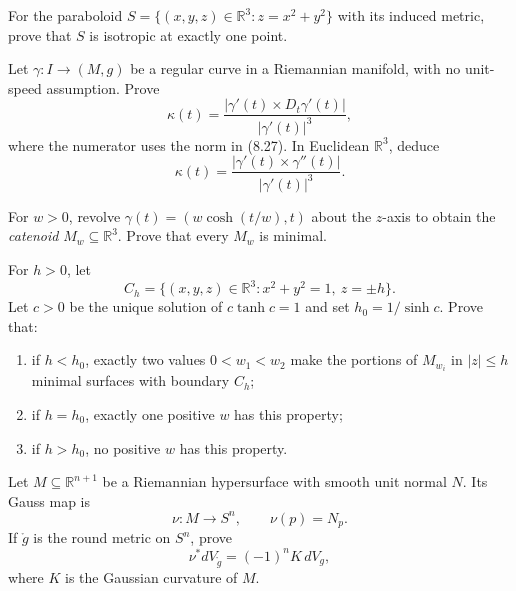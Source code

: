 \begin{exercise}
\label{prob:paraboloid-isotropic-one-point}

For the paraboloid
$S=\{(x,y,z)\in\mathbb R^3:z=x^2+y^2\}$ with its induced metric, prove that
$S$ is isotropic at exactly one point.
\end{exercise}

\begin{exercise}
\label{prob:geodesic-curvature-non-unit-speed-curve}

Let $\gamma:I\to(M,g)$ be a regular curve in a Riemannian manifold, with no
unit-speed assumption. Prove
\[
\kappa(t)=
\frac{|\gamma'(t)\times D_t\gamma'(t)|}{|\gamma'(t)|^3},
\]
where the numerator uses the norm in (8.27). In Euclidean $\mathbb R^3$,
deduce
\[
\kappa(t)=
\frac{|\gamma'(t)\times\gamma''(t)|}{|\gamma'(t)|^3}.
\]
\end{exercise}

\begin{exercise}
\label{prob:catenoid-minimal-surface}

For $w>0$, revolve
$\gamma(t)=(w\cosh(t/w),t)$ about the $z$-axis to obtain the
\emph{catenoid} $M_w\subseteq\mathbb R^3$. Prove that every $M_w$ is minimal.
\end{exercise}

\begin{exercise}
\label{prob:catenoid-boundary-minimal}

For $h>0$, let
\[
C_h=\{(x,y,z)\in\mathbb R^3:x^2+y^2=1,\ z=\pm h\}.
\]
Let $c>0$ be the unique solution of $c\tanh c=1$ and set
$h_0=1/\sinh c$. Prove that:
\begin{enumerate}
\item if $h<h_0$, exactly two values $0<w_1<w_2$ make the portions of
$M_{w_i}$ in $|z|\leq h$ minimal surfaces with boundary $C_h$;
\item if $h=h_0$, exactly one positive $w$ has this property;
\item if $h>h_0$, no positive $w$ has this property.
\end{enumerate}
\end{exercise}

\begin{exercise}
\label{prob:gauss-map}

Let $M\subseteq\mathbb R^{n+1}$ be a Riemannian hypersurface with smooth unit
normal $N$. Its Gauss map is
\[
\nu:M\to S^n,\qquad \nu(p)=N_p.
\]
If $\mathring g$ is the round metric on $S^n$, prove
\[
\nu^*dV_{\mathring g}=(-1)^nK\,dV_g,
\]
where $K$ is the Gaussian curvature of $M$.
\end{exercise}

